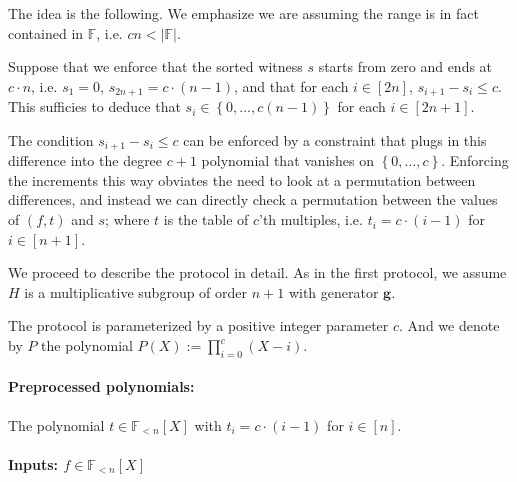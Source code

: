 \documentclass[11pt]{article} %
\newcommand{\F}{\ensuremath{\mathbb F}\xspace}
\newcommand{\defeq}{:=}
\newcommand{\set}[1]{\ensuremath{\left\{#1\right\}}\xspace}
\newcommand{\hgen}{\ensuremath{\mathbf{g}}\xspace}
\newcommand{\polysofdeg}[1]{\ensuremath{\F_{< #1}[X]}\xspace}
\begin{document}
The idea is the following. We emphasize we are assuming the range is in fact contained in \F, i.e. $cn < |\F|$.

Suppose that we enforce that the sorted witness $s$ starts from zero and ends at $c\cdot n$, i.e. $s_1=0$, $s_{2n+1} = c\cdot (n-1)$, and that for each $i\in [2n]$, $s_{i+1}-s_i \leq c$.
This sufficies to deduce that $s_i \in \set{0,\ldots,c(n-1)}$ for each $i\in [2n+1]$.

The condition $s_{i+1}-s_i \leq c$ can be enforced by a constraint that plugs in this difference into the degree $c+1$ polynomial that vanishes on \set{0,\ldots,c}. Enforcing the increments this way obviates the need to look at a permutation between differences, and instead we can directly check a permutation between the values of $(f,t)$ and $s$; where $t$ is the table of $c$'th multiples, i.e. $t_i = c\cdot (i-1)$ for $i\in [n+1]$.

We proceed to describe the protocol in detail.
As in the first protocol, we assume $H$ is a multiplicative subgroup of order $n+1$ with generator \hgen.

The protocol is parameterized by a positive integer parameter $c$.
And we denote by $P$ the polynomial
$P(X)\defeq \prod_{i= 0}^c(X-i)$.
\paragraph{Preprocessed polynomials:}
The polynomial $t \in \polysofdeg{n}$  with $t_i = c\cdot (i-1)$ for $i\in [n]$.

\paragraph{Inputs: $f\in \polysofdeg{n}$}
\end{document}
